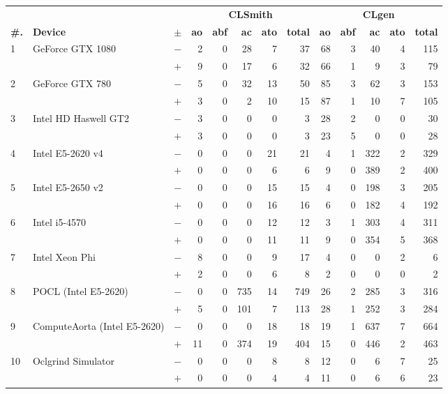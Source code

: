   \begin{tabular}{lll | rrrrr | rrrrr }
  \toprule
  & & & \multicolumn{5}{c|}{\textbf{CLSmith}} & \multicolumn{5}{c}{\textbf{CLgen}} \\
  \textbf{\#.} & \textbf{Device} & $\pm$ &
  \textbf{ao} & \textbf{abf} & \textbf{ac} & \textbf{ato} & \textbf{total} &
  \textbf{ao} & \textbf{abf} & \textbf{ac} & \textbf{ato} & \textbf{total} \\
  \midrule
  \multirow{ 2}{*}{1} & \multirow{ 2}{*}{GeForce GTX 1080} & $-$ & 2 & 0 & 28 & 7 & 37       & 68 & 3 & 40 & 4 & 115 \\& & $+$ & 9 & 0 & 17 & 6 & 32 & 66 & 1 & 9 & 3 & 79 \\
\hline
\multirow{ 2}{*}{2} & \multirow{ 2}{*}{GeForce GTX 780} & $-$ & 5 & 0 & 32 & 13 & 50       & 85 & 3 & 62 & 3 & 153 \\& & $+$ & 3 & 0 & 2 & 10 & 15 & 87 & 1 & 10 & 7 & 105 \\
\hline
\multirow{ 2}{*}{3} & \multirow{ 2}{*}{Intel HD Haswell GT2} & $-$ & 3 & 0 & 0 & 0 & 3       & 28 & 2 & 0 & 0 & 30 \\& & $+$ & 3 & 0 & 0 & 0 & 3 & 23 & 5 & 0 & 0 & 28 \\
\hline
\multirow{ 2}{*}{4} & \multirow{ 2}{*}{Intel E5-2620 v4} & $-$ & 0 & 0 & 0 & 21 & 21       & 4 & 1 & 322 & 2 & 329 \\& & $+$ & 0 & 0 & 0 & 6 & 6 & 9 & 0 & 389 & 2 & 400 \\
\hline
\multirow{ 2}{*}{5} & \multirow{ 2}{*}{Intel E5-2650 v2} & $-$ & 0 & 0 & 0 & 15 & 15       & 4 & 0 & 198 & 3 & 205 \\& & $+$ & 0 & 0 & 0 & 16 & 16 & 6 & 0 & 182 & 4 & 192 \\
\hline
\multirow{ 2}{*}{6} & \multirow{ 2}{*}{Intel i5-4570} & $-$ & 0 & 0 & 0 & 12 & 12       & 3 & 1 & 303 & 4 & 311 \\& & $+$ & 0 & 0 & 0 & 11 & 11 & 9 & 0 & 354 & 5 & 368 \\
\hline
\multirow{ 2}{*}{7} & \multirow{ 2}{*}{Intel Xeon Phi} & $-$ & 8 & 0 & 0 & 9 & 17       & 4 & 0 & 0 & 2 & 6 \\& & $+$ & 2 & 0 & 0 & 6 & 8 & 2 & 0 & 0 & 0 & 2 \\
\hline
\multirow{ 2}{*}{8} & \multirow{ 2}{*}{POCL (Intel E5-2620)} & $-$ & 0 & 0 & 735 & 14 & 749       & 26 & 2 & 285 & 3 & 316 \\& & $+$ & 5 & 0 & 101 & 7 & 113 & 28 & 1 & 252 & 3 & 284 \\
\hline
\multirow{ 2}{*}{9} & \multirow{ 2}{*}{ComputeAorta (Intel E5-2620)} & $-$ & 0 & 0 & 0 & 18 & 18       & 19 & 1 & 637 & 7 & 664 \\& & $+$ & 11 & 0 & 374 & 19 & 404 & 15 & 0 & 446 & 2 & 463 \\
\hline
\multirow{ 2}{*}{10} & \multirow{ 2}{*}{Oclgrind Simulator} & $-$ & 0 & 0 & 0 & 8 & 8       & 12 & 0 & 6 & 7 & 25 \\& & $+$ & 0 & 0 & 0 & 4 & 4 & 11 & 0 & 6 & 6 & 23 \\
  \bottomrule
\end{tabular}

